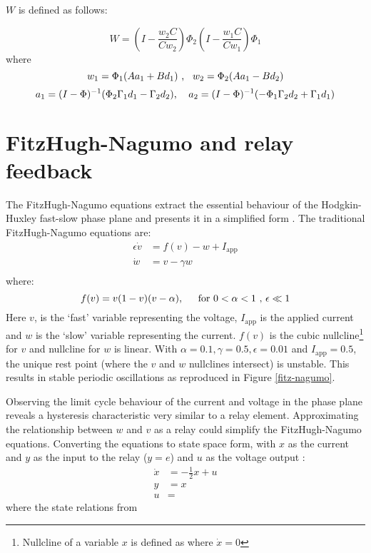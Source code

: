 \documentclass[a4paper]{article}
\begin{document}
$W$ is defined as follows:

\begin{equation}
W = \left(I - \frac{w_2C}{Cw_2}\right)\Phi_2\left(I - \frac{w_1C}{Cw_1}\right)\Phi_1
\end{equation}
where
\begin{equation}
w_1 = \Phi_1(Aa_1 + Bd_1) \text{ ,\hspace{0.3cm}} w_2 = \Phi_2(Aa_1 - Bd_2)
\end{equation}
\begin{equation}
a_1 = (I - \Phi)^{-1}(\Phi_2\Gamma_1d_1 - \Gamma_2d_2) \text{, \hspace{0.3cm}} a_2 = (I - \Phi)^{-1}(-\Phi_1\Gamma_2d_2 + \Gamma_1d_1)
\end{equation}
 




\section{FitzHugh-Nagumo and relay feedback}
The FitzHugh-Nagumo equations extract the essential behaviour of the Hodgkin-Huxley fast-slow phase plane and presents it in a simplified form \cite{keener}. The traditional FitzHugh-Nagumo equations are:
\begin{align}
\epsilon \dot{v} &= f(v) - w + I_{\text{app}}\\
\dot{w} &= v - \gamma w \\
\end{align}
where:
\begin{equation}
f(v) = v(1-v)(v-\alpha), \text{\hspace{0.4cm} for }0 <\alpha<1\text{ , } \epsilon\ll 1
\end{equation}
Here $v$, is the `fast' variable representing the voltage, $I_{\text{app}}$ is the applied current and $w$ is the `slow' variable representing the current.  $f(v)$ is the cubic nullcline\footnote{Nullcline of a variable $x$ is defined as where $\dot{x} = 0$} for $v$ and nullcline for $w$ is linear. With $\alpha = 0.1, \gamma = 0.5, \epsilon = 0.01$ and $I_{\text{app}} = 0.5$, the unique rest point (where the $v$ and $w$ nullclines intersect) is unstable. This results in stable periodic oscillations \cite{keener} as reproduced in Figure \ref{fitz-nagumo}. 

Observing the limit cycle behaviour of the current and voltage in the phase plane reveals a hysteresis characteristic very similar to a relay element. Approximating the relationship between $w$ and $v$ as a relay could simplify the FitzHugh-Nagumo equations. Converting the equations to state space form, with $x$ as the current and $y$ as the input to the relay ($y = e$) and $u$ as the voltage output :
\begin{align}
\dot{x} &= -\tfrac{1}{2}x + u \\
y &= x\\
u &= 
\end{align}
where the state relations from 
\end{document}
